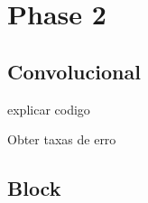 \section{Phase 2}

\subsection{Convolucional}
explicar codigo 

Obter taxas de erro 

\subsection{Block}

